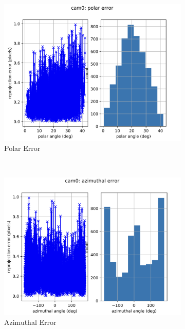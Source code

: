 \documentclass[11pt, oneside]{article}   	%
\begin{document}
\begin{figure}[ht]
\begin{subfigure}[b]{0.3\textwidth}
\includegraphics[width=\textwidth]{imgs/kalibr3.png}
\caption{Polar Error}
\end{subfigure}\\
\begin{subfigure}[b]{0.3\textwidth}
\includegraphics[width=\textwidth]{imgs/kalibr4.png}
\caption{Azimuthal Error}
\end{subfigure}
\begin{subfigure}[b]{0.3\textwidth}

\end{subfigure}
\end{figure}
\end{document}

